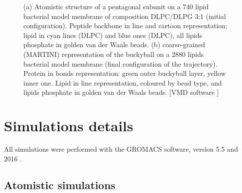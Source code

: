 \begin{figure}[t]
\centering
{}
\caption[Snapshot of simulations of capzip on model membranes]{(a) Atomistic structure of a pentagonal subunit on a 740 lipid bacterial model membrane of composition DLPC/DLPG 3:1 (initial configuration). Peptide backbone in line and cartoon representation; lipid in cyan lines (DLPC) and blue ones (DLPC), all lipids phosphate in golden van der Waals beads. (b) coarse-grained (MARTINI) representation of the buckyball on a 2880 lipids bacterial model membrane (final configuration of the trajectory). Protein in bonds representation: green outer buckyball layer, yellow inner one. Lipid in line representation, coloured by bead type, and lipids phosphate in golden van der Waals beads. [VMD software \citet{HUMP96}]}
\label{fig:pL6_vmd}
\end{figure}
\section{Simulations details} \label{sec:details}

All simulations were performed with the GROMACS software, version 5.5 and 2016 \citep{Berendsen1995,Abraham2015,gromacs_man}. 

\subsection{Atomistic simulations}
